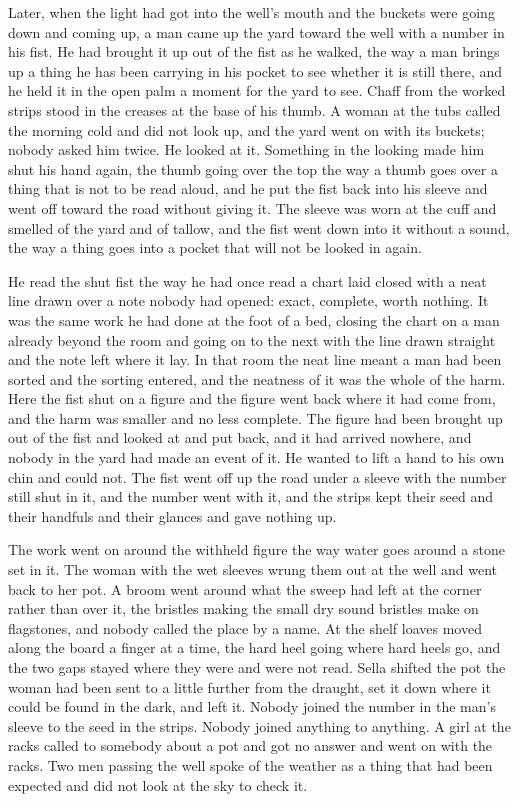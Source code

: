 Later, when the light had got into the well's mouth and the buckets were going down and coming up, a man came up the yard toward the well with a number in his fist. He had brought it up out of the fist as he walked, the way a man brings up a thing he has been carrying in his pocket to see whether it is still there, and he held it in the open palm a moment for the yard to see. Chaff from the worked strips stood in the creases at the base of his thumb. A woman at the tubs called the morning cold and did not look up, and the yard went on with its buckets; nobody asked him twice. He looked at it. Something in the looking made him shut his hand again, the thumb going over the top the way a thumb goes over a thing that is not to be read aloud, and he put the fist back into his sleeve and went off toward the road without giving it. The sleeve was worn at the cuff and smelled of the yard and of tallow, and the fist went down into it without a sound, the way a thing goes into a pocket that will not be looked in again.

He read the shut fist the way he had once read a chart laid closed with a neat line drawn over a note nobody had opened: exact, complete, worth nothing. It was the same work he had done at the foot of a bed, closing the chart on a man already beyond the room and going on to the next with the line drawn straight and the note left where it lay. In that room the neat line meant a man had been sorted and the sorting entered, and the neatness of it was the whole of the harm. Here the fist shut on a figure and the figure went back where it had come from, and the harm was smaller and no less complete. The figure had been brought up out of the fist and looked at and put back, and it had arrived nowhere, and nobody in the yard had made an event of it. He wanted to lift a hand to his own chin and could not. The fist went off up the road under a sleeve with the number still shut in it, and the number went with it, and the strips kept their seed and their handfuls and their glances and gave nothing up.

The work went on around the withheld figure the way water goes around a stone set in it. The woman with the wet sleeves wrung them out at the well and went back to her pot. A broom went around what the sweep had left at the corner rather than over it, the bristles making the small dry sound bristles make on flagstones, and nobody called the place by a name. At the shelf loaves moved along the board a finger at a time, the hard heel going where hard heels go, and the two gaps stayed where they were and were not read. Sella shifted the pot the woman had been sent to a little further from the draught, set it down where it could be found in the dark, and left it. Nobody joined the number in the man's sleeve to the seed in the strips. Nobody joined anything to anything. A girl at the racks called to somebody about a pot and got no answer and went on with the racks. Two men passing the well spoke of the weather as a thing that had been expected and did not look at the sky to check it.

